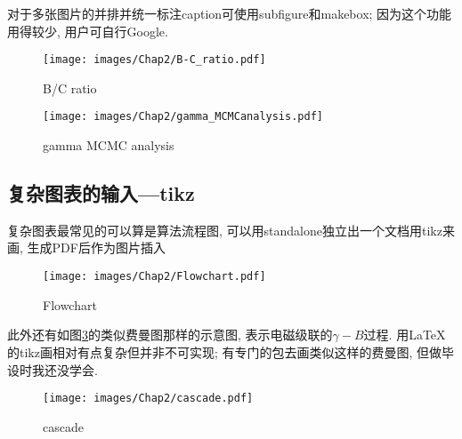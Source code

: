 \documentclass[a4paper]{article}
\begin{document}
对于多张图片的并排并统一标注caption可使用subfigure和makebox; 因为这个功能用得较少, 用户可自行Google.

\begin{figure}[th]
\parbox[t]{0.5\textwidth}{
\texttt{[image: images/Chap2/B-C\_ratio.pdf]}
\caption{B/C ratio}
\label{B-C_ratio}
}
\parbox[t]{0.5\textwidth}{
\texttt{[image: images/Chap2/gamma\_MCMCanalysis.pdf]}
\caption{gamma MCMC analysis}
\label{fig:gamma_MCMCanalysis}
}
\end{figure}

\subsection{复杂图表的输入---tikz}
\label{sec:tikz}
复杂图表最常见的可以算是算法流程图, 可以用standalone独立出一个文档用tikz来画, 生成PDF后作为图片插入
\begin{figure}[ht]
\centering
\texttt{[image: images/Chap2/Flowchart.pdf]}
\caption{Flowchart}
\label{Flowchart}
\end{figure}

\noindent 此外还有如图\ref{cascade}的类似费曼图那样的示意图, 表示电磁级联的$\gamma-B$过程. 用\LaTeX 的tikz画相对有点复杂但并非不可实现; 有专门的包去画类似这样的费曼图, 但做毕设时我还没学会.
\begin{figure}[ht]
\centering
\texttt{[image: images/Chap2/cascade.pdf]}
\caption{cascade}
\label{cascade}
\end{figure}

\end{document}
